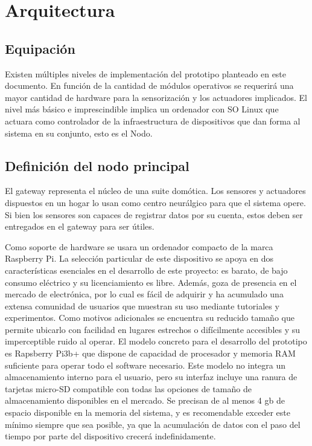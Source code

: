 \cleardoublepage

\chapter{Arquitectura}
\label{makereference4}

\section{Equipación}
\label{makereference4.1}

Existen múltiples niveles de implementación del prototipo planteado en este documento. En función de la cantidad de módulos operativos se requerirá una mayor cantidad de hardware para la sensorización y los actuadores implicados. El nivel más básico e imprescindible implica un ordenador con SO Linux que actuara como controlador de la infraestructura de dispositivos que dan forma al sistema en su conjunto, esto es el Nodo.

\section{Definición del nodo principal}
\label{makereference4.2}

El \gls{gateway} representa el núcleo de una suite domótica. Los sensores y actuadores dispuestos en un hogar lo usan como centro neurálgico para que el sistema opere. Si bien los sensores son capaces de registrar datos por su cuenta, estos deben ser entregados en el \gls{gateway} para ser útiles. 

Como soporte de hardware  se usara un ordenador compacto de la marca Raspberry Pi. La selección particular de este dispositivo se apoya en dos características esenciales en el desarrollo de este proyecto: es barato, de bajo consumo eléctrico y su licenciamiento es libre. Además, goza de presencia en el mercado de electrónica, por lo cual es fácil de adquirir y ha acumulado una extensa comunidad de usuarios que muestran su uso mediante tutoriales y experimentos. Como motivos adicionales se encuentra su reducido tamaño que permite ubicarlo con facilidad en lugares estrechos o difícilmente accesibles y su imperceptible ruido al operar. El modelo concreto para el desarrollo del prototipo es Rapsberry Pi3b+ que dispone de capacidad de procesador y memoria RAM suficiente para operar todo el software necesario. Este modelo no integra un almacenamiento interno para el usuario, pero su interfaz incluye una ranura de tarjetas micro-SD compatible con todas las opciones de tamaño de almacenamiento disponibles en el mercado. Se precisan de al menos 4 \gls{gb} de espacio disponible en la memoria del sistema, y es recomendable exceder este mínimo siempre que sea posible, ya que la acumulación de datos con el paso del tiempo por parte del dispositivo crecerá indefinidamente.

